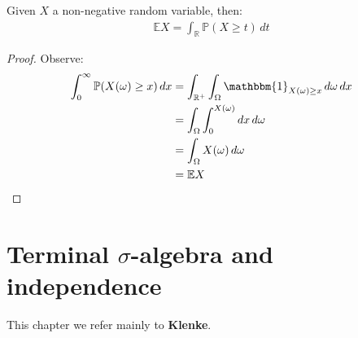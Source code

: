 \begin{proposition}
	Given $X$ a non-negative random variable, then:
	\begin{align*}
		\mathbb{E} X = \int_{\mathbb{R}} \mathbb{P}(X \geq t) \, dt
	\end{align*}
\end{proposition}
\begin{proof}
Observe:
	\begin{align*}
		\int_0^\infty \mathbb{P}(X(\omega) \geq x) \, dx &= \int_{\mathbb{R}^+} \int_\Omega \mathbbm{1}_{X(\omega) \geq x} \, d\omega \, dx\\
		&= \int_\Omega \int_0^{X(\omega)} dx \, d\omega \\
		&= \int_\Omega X(\omega) \, d\omega \\
	 	&= \mathbb{E} X
	\end{align*}
\end{proof}


\section{\texorpdfstring{Terminal $\sigma$-algebra and independence}{Terminal sigma-algebra and independence}}
This chapter we refer mainly to \textbf{Klenke}.
